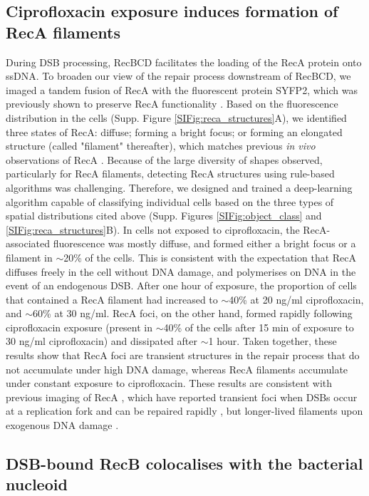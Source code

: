 \subsection*{Ciprofloxacin exposure induces formation of RecA filaments}
During DSB processing, RecBCD facilitates the loading of the RecA protein onto ssDNA. To broaden our view of the repair process down\-stream of RecBCD, we imaged a tandem fusion of RecA with the fluorescent protein SYFP2, which was previously shown to preserve RecA functionality \cite{Wiktor2021}. Based on the fluorescence distribution in the cells (Supp. Figure \ref{SIFig:reca_structures}A), we identified three states of RecA: diffuse; forming a bright focus; or forming an elongated structure (called "filament" thereafter), which matches previous \emph{in vivo} observations of RecA \cite{Wiktor2021}. Because of the large diversity of shapes observed, particularly for RecA filaments, detecting RecA structures using rule-based algorithms was challenging. Therefore, we designed and trained a deep-learning algorithm capable of classifying individual cells based on the three types of spatial distributions cited above (Supp. Figures \ref{SIFig:object_class} and \ref{SIFig:reca_structures}B). In cells not exposed to ciprofloxacin, the RecA-associated fluorescence was mostly diffuse, and formed either a bright focus or a filament in $\sim$20\% of the cells. This is consistent with the expectation that RecA diffuses freely in the cell without DNA damage, and polymerises on DNA in the event of an endogenous DSB. After one hour of exposure, the proportion of cells that contained a RecA filament had increased to $\sim$40\% at 20 ng/ml ciprofloxacin, and $\sim$60\% at 30 ng/ml. RecA foci, on the other hand, formed rapidly following ciprofloxacin exposure (present in $\sim$40\% of the cells after 15 min of exposure to 30 ng/ml ciprofloxacin) and dissipated after $\sim$1 hour. Taken together, these results show that RecA foci are transient structures in the repair process that do not accumulate under high DNA damage, whereas RecA filaments accumulate under constant exposure to ciprofloxacin. These results are consistent with previous imaging of RecA \cite{Lesterlin2013, Amarh2018, Ghodke2019, Wiktor2021}, which have reported transient foci when DSBs occur at a replication fork and can be repaired rapidly \cite{Amarh2018}, but longer-lived filaments upon exogenous DNA damage \cite{Lesterlin2013, Ghodke2019, Wiktor2021}.

\subsection*{DSB-bound RecB colocalises with the bacterial nucleoid}

